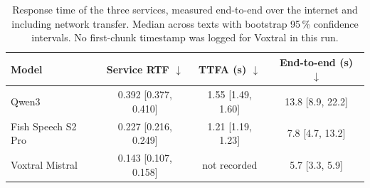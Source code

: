\begin{table}[H]
    \centering
    \small
    \begin{tabular}{lccc}
        \toprule
        \textbf{Model} & \textbf{Service RTF} $\downarrow$ & \textbf{TTFA (s)} $\downarrow$ & \textbf{End-to-end (s)} $\downarrow$ \\
        \midrule
        Qwen3 & 0.392 [0.377, 0.410] & 1.55 [1.49, 1.60] & 13.8 [8.9, 22.2] \\
        Fish Speech S2 Pro & 0.227 [0.216, 0.249] & 1.21 [1.19, 1.23] & 7.8 [4.7, 13.2] \\
        Voxtral Mistral & 0.143 [0.107, 0.158] & not recorded & 5.7 [3.3, 5.9] \\
        \bottomrule
    \end{tabular}
    \caption{Response time of the three services, measured end-to-end over the internet and including network transfer. Median across texts with bootstrap 95\,\% confidence intervals. No first-chunk timestamp was logged for Voxtral in this run.}
    \label{tab:objective_speed}
\end{table}
